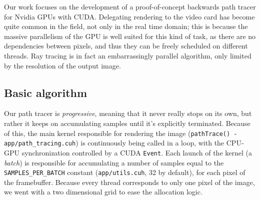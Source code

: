 \documentclass[12pt,a4paper]{article}
\begin{document}
Our work focuses on the development of a proof-of-concept backwards path tracer for Nvidia GPUs with CUDA. Delegating rendering to the video card has become quite common in the field, not only in the real time domain; this is because the massive parallelism of the GPU is well suited for this kind of task, as there are no dependencies between pixels, and thus they can be freely scheduled on different threads. Ray tracing is in fact an embarrassingly parallel algorithm, only limited by the resolution of the output image.

\subsection{Basic algorithm}
\label{sec:alg}

Our path tracer is \textit{progressive}, meaning that it never really stops on its own, but rather it keeps on accumulating samples until it's explicitly terminated. Because of this, the main kernel responsible for rendering the image (\verb|pathTrace() - app/path_tracing.cuh|) is continuously being called in a loop, with the CPU-GPU synchronization controlled by a CUDA \verb|Event|. Each launch of the kernel (a \textit{batch}) is responsible for accumulating a number of samples equal to the \verb|SAMPLES_PER_BATCH| constant (\verb|app/utils.cuh|, 32 by default), for each pixel of the framebuffer. Because every thread corresponds to only one pixel of the image, we went with a two dimensional grid to ease the allocation logic.
\end{document}
